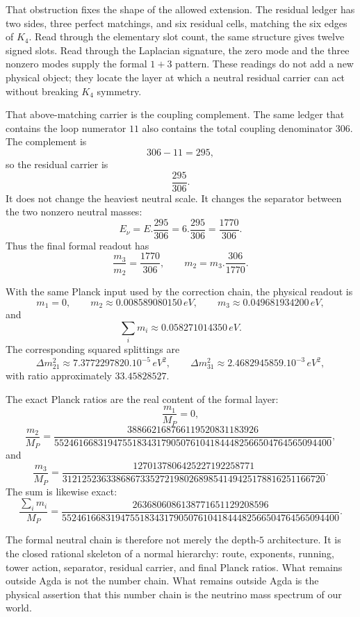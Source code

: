 \documentclass[11pt,a4paper]{book}
\def\cdot{.}%
\def\mathrm#1{#1}%
\begin{document}
That obstruction fixes the shape of the allowed extension.  The residual
ledger has two sides, three perfect matchings, and six residual cells, matching
the six edges of $K_4$.  Read through the elementary slot count, the same
structure gives twelve signed slots.  Read through the Laplacian signature,
the zero mode and the three nonzero modes supply the formal $1+3$ pattern.
These readings do not add a new physical object; they locate the layer at
which a neutral residual carrier can act without breaking $K_4$ symmetry.

That above-matching carrier is the coupling complement.  The same ledger that
contains the loop numerator $11$ also contains the total coupling denominator
$306$.  The complement is
\[
  306-11 = 295,
\]
so the residual carrier is
\[
  \frac{295}{306}.
\]
It does not change the heaviest neutral scale.  It changes the separator
between the two nonzero neutral masses:
\[
  E_\nu = E\cdot\frac{295}{306}
       = 6\cdot\frac{295}{306}
       = \frac{1770}{306}.
\]
Thus the final formal readout has
\[
  \frac{m_3}{m_2}=\frac{1770}{306},\qquad
  m_2=m_3\cdot\frac{306}{1770}.
\]

With the same Planck input used by the correction chain, the physical
readout is
\[
  m_1=0,
  \qquad
  m_2\approx0.008589080150\,\mathrm{eV},
  \qquad
  m_3\approx0.049681934200\,\mathrm{eV},
\]
and
\[
  \sum_i m_i\approx0.058271014350\,\mathrm{eV}.
\]
The corresponding squared splittings are
\[
  \Delta m^2_{21}\approx7.3772297820\cdot10^{-5}\,\mathrm{eV}^2,
  \qquad
  \Delta m^2_{31}\approx2.4682945859\cdot10^{-3}\,\mathrm{eV}^2,
\]
with ratio approximately $33.45828527$.

The exact Planck ratios are the real content of the formal layer:
\[
  \frac{m_1}{M_P}=0,
\]
\[
  \frac{m_2}{M_P}=\frac{
  388662168766119520831183926}{
  552461668319475518343179050761041844482566504764565094400},
\]
and
\[
  \frac{m_3}{M_P}=\frac{
  1270137806425227192258771}{
  312125236338686733527219802689854149425178816251166720}.
\]
The sum is likewise exact:
\[
  \frac{\sum_i m_i}{M_P}=\frac{
  2636806086138771651129208596}{
  552461668319475518343179050761041844482566504764565094400}.
\]

The formal neutral chain is therefore not merely the depth-$5$ architecture.
It is the closed rational skeleton of a normal hierarchy: route, exponents,
running, tower action, separator, residual carrier, and final Planck ratios.
What remains outside Agda is not the number chain.  What remains outside Agda
is the physical assertion that this number chain is the neutrino mass spectrum
of our world.
\end{document}
